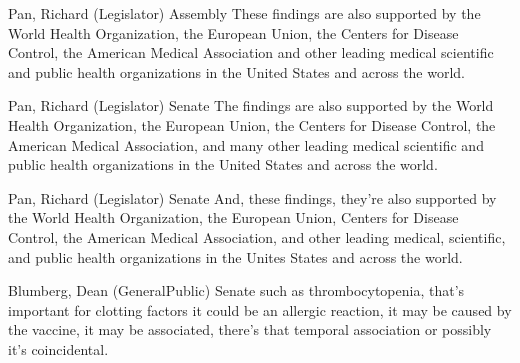 \begin{result}{12.629606480874958}{Pan, Richard (Legislator) Assembly}
These findings are also supported by the World Health Organization, the European Union, the Centers for Disease Control, the American Medical Association and other leading medical scientific and public health organizations in the United States and across the world.
\end{result}

\begin{result}{12.541612236441622}{Pan, Richard (Legislator) Senate}
The findings are also supported by the World Health Organization, the European Union, the Centers for Disease Control, the American Medical Association, and many other leading medical scientific and public health organizations in the United States and across the world.
\end{result}

\begin{result}{12.433328837184881}{Pan, Richard (Legislator) Senate}
And, these findings, they're also supported by the World Health Organization, the European Union, Centers for Disease Control, the American Medical Association, and other leading medical, scientific, and public health organizations in the Unites States and across the world.
\end{result}

\begin{result}{11.481304314112027}{Blumberg, Dean (GeneralPublic) Senate}
such as thrombocytopenia, that's important for clotting factors it could be an allergic reaction, it may be caused by the vaccine, it may be associated, there's that temporal association or possibly it's coincidental.
\end{result}

